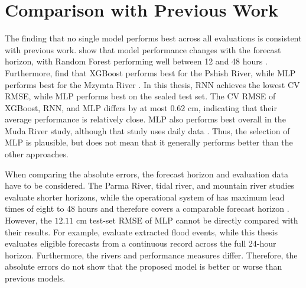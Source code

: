 \section{Comparison with Previous Work}

The finding that no single model performs best across all evaluations is consistent with previous work. \citeauthor{asifReviewIntercomparisonMachine2025} show that model performance changes with the forecast horizon, with Random Forest performing well between 12 and 48 hours \cite{asifReviewIntercomparisonMachine2025}. Furthermore, \citeauthor{belyakovaForecastingWaterLevels2022} find that XGBoost performs best for the Pshish River, while \ac{MLP} performs best for the Mzymta River \cite{belyakovaForecastingWaterLevels2022}. In this thesis, \ac{RNN} achieves the lowest \ac{CV} \ac{RMSE}, while \ac{MLP} performs best on the sealed test set. The \ac{CV} \ac{RMSE} of XGBoost, \ac{RNN}, and \ac{MLP} differs by at most $0.62$ cm, indicating that their average performance is relatively close. \ac{MLP} also performs best overall in the Muda River study, although that study uses daily data \cite{zakariaExploringMachineLearning2023}. Thus, the selection of \ac{MLP} is plausible, but does not mean that it generally performs better than the other approaches.

When comparing the absolute errors, the forecast horizon and evaluation data have to be considered. The Parma River, tidal river, and mountain river studies evaluate shorter horizons, while the operational system of \citeauthor{nevoFloodForecastingMachine2022} has maximum lead times of eight to 48 hours and therefore covers a comparable forecast horizon \cite{dazziFloodStageForecasting2021,guoPredictionRiverStage2021,belyakovaForecastingWaterLevels2022,nevoFloodForecastingMachine2022}. However, the $12.11$ cm test-set \ac{RMSE} of \ac{MLP} cannot be directly compared with their results. For example, \citeauthor{dazziFloodStageForecasting2021} evaluate extracted flood events, while this thesis evaluates eligible forecasts from a continuous record across the full 24-hour horizon. Furthermore, the rivers and performance measures differ. Therefore, the absolute errors do not show that the proposed model is better or worse than previous models.

